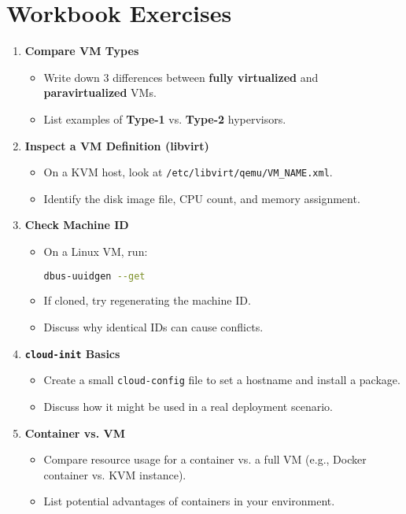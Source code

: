 \documentclass[a4paper]{report}
\begin{document}
\section*{Workbook Exercises}

\begin{enumerate}
    \item \textbf{Compare VM Types}
    \begin{itemize}
        \item Write down 3 differences between \textbf{fully virtualized} and \textbf{paravirtualized} VMs.
        \item List examples of \textbf{Type-1} vs. \textbf{Type-2} hypervisors.
    \end{itemize}

    \item \textbf{Inspect a VM Definition (libvirt)}
    \begin{itemize}
        \item On a KVM host, look at \texttt{/etc/libvirt/qemu/VM\_NAME.xml}.
        \item Identify the disk image file, CPU count, and memory assignment.
    \end{itemize}

    \item \textbf{Check Machine ID}
    \begin{itemize}
        \item On a Linux VM, run:
        \begin{lstlisting}[language=bash]
dbus-uuidgen --get
        \end{lstlisting}
        \item If cloned, try regenerating the machine ID.
        \item Discuss why identical IDs can cause conflicts.
    \end{itemize}

    \item \textbf{\texttt{cloud-init} Basics}
    \begin{itemize}
        \item Create a small \texttt{cloud-config} file to set a hostname and install a package.
        \item Discuss how it might be used in a real deployment scenario.
    \end{itemize}

    \item \textbf{Container vs. VM}
    \begin{itemize}
        \item Compare resource usage for a container vs. a full VM (e.g., Docker container vs. KVM instance).
        \item List potential advantages of containers in your environment.
    \end{itemize}
\end{enumerate}
\end{document}
